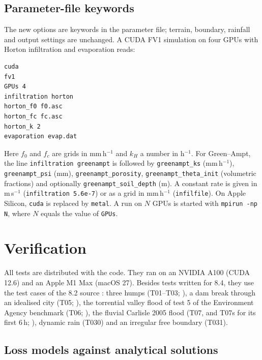 \documentclass[draft,linenumbers]{agujournal2025}
\begin{document}
\subsection{Parameter-file keywords}\label{sec:usage}

The new options are keywords in the parameter file; terrain, boundary,
rainfall and output settings are unchanged. A CUDA FV1 simulation on four
GPUs with Horton infiltration and evaporation reads:
\begin{verbatim}
cuda
fv1
GPUs 4
infiltration horton
horton_f0 f0.asc
horton_fc fc.asc
horton_k 2
evaporation evap.dat
\end{verbatim}
Here $f_0$ and $f_c$ are grids in mm\,h$^{-1}$ and $k_H$ a number in
h$^{-1}$. For Green--Ampt, the line \texttt{infiltration greenampt} is
followed by \texttt{greenampt\_ks} (mm\,h$^{-1}$), \texttt{greenampt\_psi}
(mm), \texttt{greenampt\_porosity}, \texttt{greenampt\_theta\_init}
(volumetric fractions) and optionally \texttt{greenampt\_soil\_depth} (m).
A constant rate is given in m\,s$^{-1}$ (\texttt{infiltration 5.6e-7}) or as a
grid in mm\,h$^{-1}$ (\texttt{infilfile}). On Apple Silicon, \texttt{cuda} is
replaced by \texttt{metal}. A run on $N$ GPUs is started with
\texttt{mpirun -np N}, where $N$ equals the value of \texttt{GPUs}.

\section{Verification}\label{sec:verification}

All tests are distributed with the code. They ran on an NVIDIA A100 (CUDA
12.6) and an Apple M1 Max (macOS 27). Besides tests written for 8.4, they use
the test cases of the 8.2 source \cite{LISFLOODFP82zenodo}: three humps
(T01--T03; ), a dam break through an
idealised city (T05; ), the torrential valley flood
of test 5 of the Environment Agency benchmark (T06;
), the fluvial Carlisle 2005 flood (T07, and
T07s for its first 6\,h; ),
dynamic rain (T030) and an irregular free boundary (T031).

\subsection{Loss models against analytical solutions}\label{sec:losstests}
\end{document}
